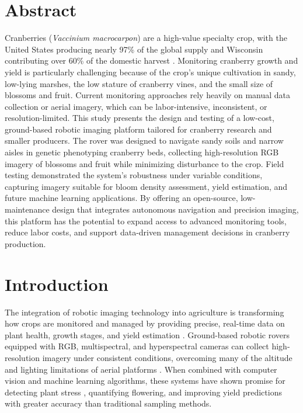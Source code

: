 \section{Abstract}

\begin{singlespace}
Cranberries (\textit{Vaccinium macrocarpon}) are a high-value specialty crop, with the United States producing nearly 97\% of the global supply and Wisconsin contributing over 60\% of the domestic harvest \cite{usda-nass_cranberries_2024}. Monitoring cranberry growth and yield is particularly challenging because of the crop’s unique cultivation in sandy, low-lying marshes, the low stature of cranberry vines, and the small size of blossoms and fruit. Current monitoring approaches rely heavily on manual data collection or aerial imagery, which can be labor-intensive, inconsistent, or resolution-limited. This study presents the design and testing of a low-cost, ground-based robotic imaging platform tailored for cranberry research and smaller producers. The rover was designed to navigate sandy soils and narrow aisles in genetic phenotyping cranberry beds, collecting high-resolution RGB imagery of blossoms and fruit while minimizing disturbance to the crop. Field testing demonstrated the system’s robustness under variable conditions, capturing imagery suitable for bloom density assessment, yield estimation, and future machine learning applications. By offering an open-source, low-maintenance design that integrates autonomous navigation and precision imaging, this platform has the potential to expand access to advanced monitoring tools, reduce labor costs, and support data-driven management decisions in cranberry production.
\end{singlespace}

\newpage

\section{Introduction}

The integration of robotic imaging technology into agriculture is transforming how crops are monitored and managed by providing precise, real-time data on plant health, growth stages, and yield estimation \cite{cinat_comparison_2019}. Ground-based robotic rovers equipped with RGB, multispectral, and hyperspectral cameras can collect high-resolution imagery under consistent conditions, overcoming many of the altitude and lighting limitations of aerial platforms \cite{wendel_self-supervised_2016}. When combined with computer vision and machine learning algorithms, these systems have shown promise for detecting plant stress \cite{abebe_image-based_2023}, quantifying flowering, and improving yield predictions with greater accuracy than traditional sampling methods.

